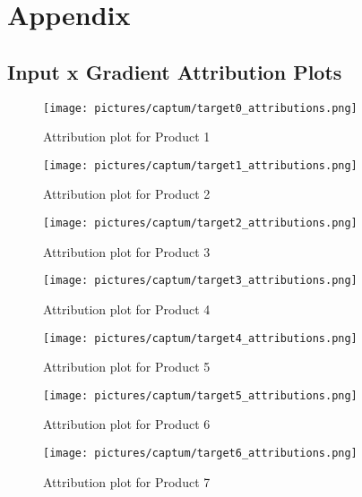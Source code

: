 \section{Appendix}


\label{Appendix_InputxGradient}
\subsection{Input x Gradient Attribution Plots}

\begin{figure}[H]
    \centering
    \texttt{[image: pictures/captum/target0\_attributions.png]}
    \caption{Attribution plot for Product 1}
    \label{fig:appenidix_agg1_Captum}
\end{figure}

\begin{figure}[H]
    \centering
    \texttt{[image: pictures/captum/target1\_attributions.png]}
    \caption{Attribution plot for Product 2}
    \label{fig:appenidix_agg2_Captum}
\end{figure}

\begin{figure}[H]
    \centering
    \texttt{[image: pictures/captum/target2\_attributions.png]}
    \caption{Attribution plot for Product 3}
    \label{fig:appenidix_agg3_Captum}
\end{figure}

\begin{figure}[H]
    \centering
    \texttt{[image: pictures/captum/target3\_attributions.png]}
    \caption{Attribution plot for Product 4}
    \label{fig:appenidix_agg4_Captum}
\end{figure}

\begin{figure}[H]
    \centering
    \texttt{[image: pictures/captum/target4\_attributions.png]}
    \caption{Attribution plot for Product 5}
    \label{fig:appenidix_agg5_Captum}
\end{figure}

\begin{figure}[H]
    \centering
    \texttt{[image: pictures/captum/target5\_attributions.png]}
    \caption{Attribution plot for Product 6}
    \label{fig:appenidix_agg6_Captum}
\end{figure}

\begin{figure}[H]
    \centering
    \texttt{[image: pictures/captum/target6\_attributions.png]}
    \caption{Attribution plot for Product 7}
    \label{fig:appenidix_agg7_Captum}
\end{figure}

